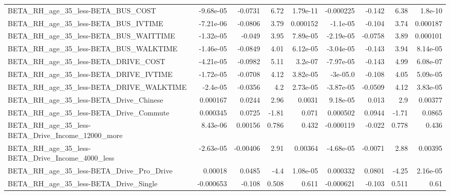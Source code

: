 \begin{tabular}{lrrrrrrrr}
BETA\_RH\_age\_35\_less-BETA\_BUS\_COST                  &   -9.68e-05 &      -0.0731 &      6.72 & 1.79e-11 &  -0.000225 &      -0.142 &         6.38 &       1.8e-10 \\
BETA\_RH\_age\_35\_less-BETA\_BUS\_IVTIME                &   -7.21e-06 &      -0.0806 &      3.79 & 0.000152 &   -1.1e-05 &      -0.104 &         3.74 &      0.000187 \\
BETA\_RH\_age\_35\_less-BETA\_BUS\_WAITTIME              &   -1.32e-05 &       -0.049 &      3.95 & 7.89e-05 &  -2.19e-05 &     -0.0758 &         3.89 &      0.000101 \\
BETA\_RH\_age\_35\_less-BETA\_BUS\_WALKTIME              &   -1.46e-05 &      -0.0849 &      4.01 & 6.12e-05 &  -3.04e-05 &      -0.143 &         3.94 &      8.14e-05 \\
BETA\_RH\_age\_35\_less-BETA\_DRIVE\_COST                &   -4.21e-05 &      -0.0982 &      5.11 &  3.2e-07 &  -7.97e-05 &      -0.143 &         4.99 &      6.08e-07 \\
BETA\_RH\_age\_35\_less-BETA\_DRIVE\_IVTIME              &   -1.72e-05 &      -0.0708 &      4.12 & 3.82e-05 &   -3e-05.0 &      -0.108 &         4.05 &      5.09e-05 \\
BETA\_RH\_age\_35\_less-BETA\_DRIVE\_WALKTIME            &    -2.4e-05 &      -0.0356 &       4.2 & 2.73e-05 &  -3.87e-05 &     -0.0509 &         4.12 &      3.83e-05 \\
BETA\_RH\_age\_35\_less-BETA\_Drive\_Chinese             &    0.000167 &       0.0244 &      2.96 &   0.0031 &   9.18e-05 &       0.013 &          2.9 &       0.00377 \\
BETA\_RH\_age\_35\_less-BETA\_Drive\_Commute             &    0.000345 &       0.0725 &     -1.81 &    0.071 &   0.000502 &      0.0944 &        -1.71 &        0.0865 \\
BETA\_RH\_age\_35\_less-BETA\_Drive\_Income\_12000\_more   &    8.43e-06 &      0.00156 &     0.786 &    0.432 &  -0.000119 &      -0.022 &        0.778 &         0.436 \\
BETA\_RH\_age\_35\_less-BETA\_Drive\_Income\_4000\_less    &   -2.63e-05 &     -0.00406 &      2.91 &  0.00364 &  -4.68e-05 &     -0.0071 &         2.88 &       0.00395 \\
BETA\_RH\_age\_35\_less-BETA\_Drive\_Pro\_Drive           &     0.00018 &       0.0485 &      -4.4 & 1.08e-05 &   0.000332 &      0.0801 &        -4.25 &      2.16e-05 \\
BETA\_RH\_age\_35\_less-BETA\_Drive\_Single              &   -0.000653 &       -0.108 &     0.508 &    0.611 &  -0.000621 &      -0.103 &        0.511 &          0.61 \\

\end{tabular}
